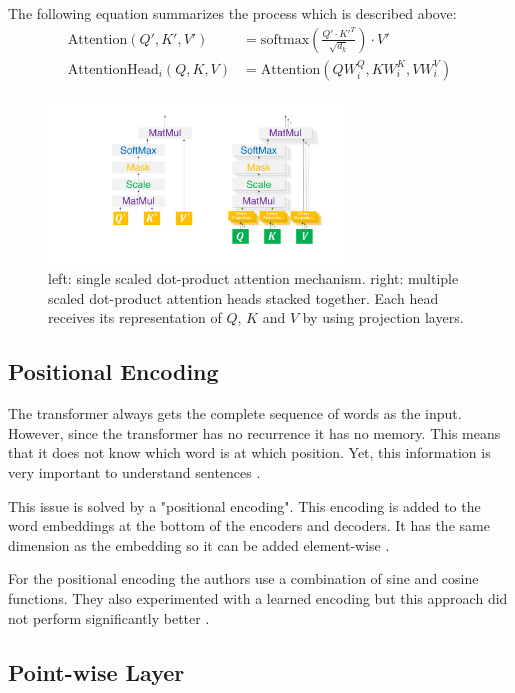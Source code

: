 The following equation summarizes the process which is described above:
\begin{align}
	\text{Attention}(Q', K', V') & = \text{softmax}(\frac{Q' \cdot K'^T}{\sqrt{d_k}}) \cdot V' \\
	\text{AttentionHead}_i(Q, K, V) & = \text{Attention}(QW_i^Q, KW_i^K, VW_i^V)
\end{align}

\begin{figure}[htp]
	\centering
	\includegraphics[width=0.7\textwidth]{figures/03_theory/03_transformer_ScaledDot}
	\caption{left: single scaled dot-product attention mechanism. right: multiple scaled dot-product attention heads stacked together. Each head receives its representation of $Q$, $K$ and $V$ by using projection layers.}
	\label{fig:03_transformer_scaledDotProduct}
\end{figure}

\subsection{Positional Encoding}

The transformer always gets the complete sequence of words as the input. However, since the transformer has no recurrence it has no memory. This means that it does not know which word is at which position. Yet, this information is very important to understand sentences \cite{Vaswani2017d}. 
\medskip

This issue is solved by a "positional encoding". This encoding is added to the word embeddings at the bottom of the encoders and decoders. It has the same dimension as the embedding so it can be added element-wise \cite{Vaswani2017d}.

For the positional encoding the authors use a combination of sine and cosine functions. They also experimented with a learned encoding but this approach did not perform significantly better \cite{Vaswani2017d}.

\subsection{Point-wise Layer}

